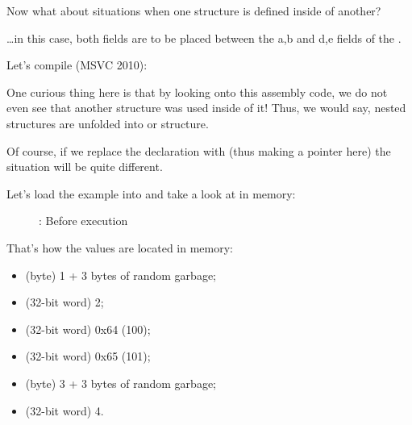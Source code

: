 
Now what about situations when one structure is defined inside of another?



\dots in this case, both  fields are to be placed between the a,b and d,e fields of
the .

Let's compile (MSVC 2010):



One curious thing here is that by looking onto this assembly code, we do not even see that
another structure was used inside of it!
Thus, we would say, nested structures are unfolded into  or  structure.

Of course, if we replace the  declaration with  
(thus making a pointer here) the situation will be quite different.

\clearpage
\subsectionold{\olly}
\myindex{\olly}

Let's load the example into \olly and take a look at 
 in memory:

\begin{figure}[H]
\centering
{}
\caption{\olly: Before \printf execution}
\label{fig:nested_olly}
\end{figure}

That's how the values are located in memory:
\begin{itemize}
\item {} (byte) 1 + 3 bytes of random garbage;
\item {} (32-bit word) 2;
\item {} (32-bit word) 0x64 (100);
\item {} (32-bit word) 0x65 (101);
\item {} (byte) 3 + 3 bytes of random garbage;
\item {} (32-bit word) 4.
\end{itemize}

